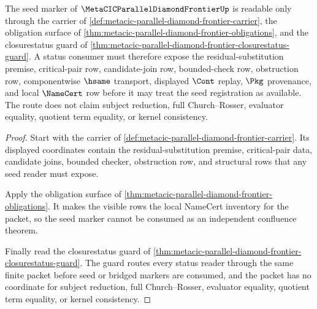 \begin{theorem}
\label{thm:metacic-parallel-diamond-frontier-closure-seed-current-route}
The seed marker of $\MetaCICParallelDiamondFrontierUp$ is readable only through the carrier of \autoref{def:metacic-parallel-diamond-frontier-carrier}, the obligation surface of \autoref{thm:metacic-parallel-diamond-frontier-obligations}, and the closurestatus guard of \autoref{thm:metacic-parallel-diamond-frontier-closurestatus-guard}. A status consumer must therefore expose the residual-substitution premise, critical-pair row, candidate-join row, bounded-check row, obstruction row, componentwise $\hsame$ transport, displayed $\Cont$ replay, $\Pkg$ provenance, and local $\NameCert$ row before it may treat the seed registration as available. The route does not claim subject reduction, full Church--Rosser, evaluator equality, quotient term equality, or kernel consistency.
\end{theorem}
\begin{proof}
Start with the carrier of \autoref{def:metacic-parallel-diamond-frontier-carrier}. Its displayed coordinates contain the residual-substitution premise, critical-pair data, candidate joins, bounded checker, obstruction row, and structural rows that any seed reader must expose.

Apply the obligation surface of \autoref{thm:metacic-parallel-diamond-frontier-obligations}. It makes the visible rows the local NameCert inventory for the packet, so the seed marker cannot be consumed as an independent confluence theorem.

Finally read the closurestatus guard of \autoref{thm:metacic-parallel-diamond-frontier-closurestatus-guard}. The guard routes every status reader through the same finite packet before seed or bridged markers are consumed, and the packet has no coordinate for subject reduction, full Church--Rosser, evaluator equality, quotient term equality, or kernel consistency.
\end{proof}
